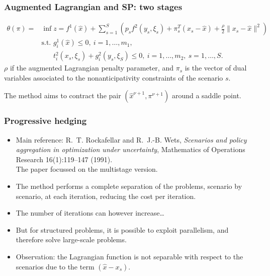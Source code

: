 \documentclass{beamer}
\begin{document}
\begin{frame}
\frametitle{Augmented Lagrangian and SP: two stages}

\vspace*{-0.5cm}

\begin{align*}
\theta(\pi) = & \inf z = f^1(\hat{x}) + \sum_{s=1}^{S} \left(
  p_sf^2(y_s,\xi_s) + \pi_s^T(x_s-\hat{x}) + \frac{\rho}{2} \|
x_s-\hat{x} \|^2\right) \\
& \text{s.t. } g_i^1(\hat{x}) \leq 0,\ i=1,\ldots{},m_1,\\
& \phantom{\text{s.t. }} t_i^2(x_s,\xi_s)+g_i^2(y_s,\xi_S) \leq 0,\ 
i=1,\ldots{},m_2,\ s=1,\ldots{},S.
\end{align*}
$\rho$ if the augmented Lagrangian penalty parameter, and $\pi_s$ is the vector of dual variables associated to the nonanticipativity constraints of the scenario  $s$.

\mbox{}

The method aims to contract the pair $(\hat{x}^{\nu+1}, \pi^{\nu+1})$ around a saddle point.

\end{frame}

\begin{frame}
\frametitle{Progressive hedging}

\begin{itemize}
\item
Main reference:
R.~T. Rockafellar and R.~J.-B. Wets, {\sl Scenarios and policy aggregation
in optimization under uncertainty}, Mathematics of Operations
  Research 16(1):119--147 (1991).\\
  The paper focussed on the multistage version.
\item
The method performs a complete separation of the problems, scenario by scenario, at each iteration, reducing the cost per iteration.
\item
The number of iterations can however increase\ldots
\item
But for structured problems, it is possible to exploit parallelism, and therefore solve large-scale problems.
\item
{\red Observation}:
the Lagrangian function is not separable with respect to the scenarios due to the term $(\hat{x}-x_s)$.
\end{itemize}

\end{frame}
\end{document}
